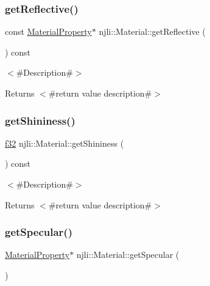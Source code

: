 \subsubsection{\texorpdfstring{get\+Reflective()}{getReflective()}\hspace{0.1cm}{\footnotesize\ttfamily [2/2]}}
{\footnotesize\ttfamily const \mbox{\hyperlink{classnjli_1_1_material_property}{Material\+Property}}$\ast$ njli\+::\+Material\+::get\+Reflective (\begin{DoxyParamCaption}{ }\end{DoxyParamCaption}) const}

$<$\#\+Description\#$>$

\begin{DoxyReturn}{Returns}
$<$\#return value description\#$>$ 
\end{DoxyReturn}
\mbox{\label{classnjli_1_1_material_aae200625d8caa2c551beca640945249a}} 
\subsubsection{\texorpdfstring{get\+Shininess()}{getShininess()}}
{\footnotesize\ttfamily \mbox{\hyperlink{_util_8h_a5f6906312a689f27d70e9d086649d3fd}{f32}} njli\+::\+Material\+::get\+Shininess (\begin{DoxyParamCaption}{ }\end{DoxyParamCaption}) const}

$<$\#\+Description\#$>$

\begin{DoxyReturn}{Returns}
$<$\#return value description\#$>$ 
\end{DoxyReturn}
\mbox{\label{classnjli_1_1_material_afc56ace85ceb0366d6419f4802a3bac6}} 
\subsubsection{\texorpdfstring{get\+Specular()}{getSpecular()}\hspace{0.1cm}{\footnotesize\ttfamily [1/2]}}
{\footnotesize\ttfamily \mbox{\hyperlink{classnjli_1_1_material_property}{Material\+Property}}$\ast$ njli\+::\+Material\+::get\+Specular (\begin{DoxyParamCaption}{ }\end{DoxyParamCaption})}

